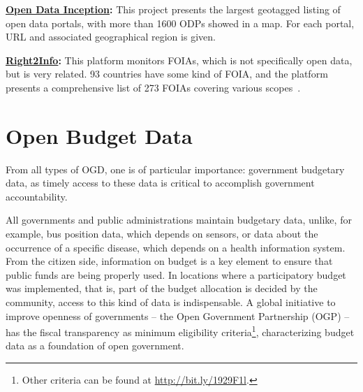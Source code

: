 \textbf{\href{http://opendatainception.io/}{Open Data Inception}:} This project presents the largest geotagged listing of open data portals, with more than 1600 ODPs showed in a map. For each portal, URL and associated geographical region is given.

\textbf{\href{http://right2info.org}{Right2Info}:} This platform monitors FOIAs, which is not specifically open data, but is very related. 93 countries have some kind of FOIA, and the platform presents a comprehensive list of 273 FOIAs covering various scopes~\cite{Vleugels2012}.

\section{Open Budget Data}

From all types of OGD, one is of particular importance: government budgetary data, as timely access to these data is critical to accomplish government accountability.

All governments and public administrations maintain budgetary data, unlike, for example, bus position data, which depends on sensors, or data about the occurrence of a specific disease, which depends on a health information system.
From the citizen side, information on budget is a key element to ensure that public funds are being properly used.
In locations where a participatory budget~\cite{Mkude2014} was implemented, that is, part of the budget allocation is decided by the community, access to this kind of data is indispensable.
A global initiative to improve openness of governments -- the Open Government Partnership (OGP) -- has the fiscal transparency as minimum eligibility criteria\footnote{Other criteria can be found at \url{http://bit.ly/1929F1l}.}, characterizing budget data as a foundation of open government.


